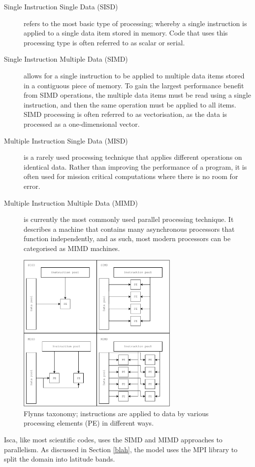 \documentclass[a4paper,11pt]{report}
\begin{document}
\begin{description}
	\item[Single Instruction Single Data (SISD)] refers to the most basic type of processing; whereby a single instruction is applied to a single data item stored in memory. Code that uses this processing type is often referred to as scalar or serial. 
	
	\item[Single Instruction Multiple Data (SIMD)] allows for a single instruction to be applied to multiple data items stored in a contiguous piece of memory. To gain the largest performance benefit from SIMD operations, the multiple data items must be read using a single instruction, and then the same operation must be applied to all items. SIMD processing is often referred to as vectorisation, as the data is processed as a one-dimensional vector. 
	
	\item[Multiple Instruction Single Data (MISD)] is a rarely used processing technique that applies different operations on identical data. Rather than improving the performance of a program, it is often used for mission critical computations where there is no room for error. 
	
	\item[Multiple Instruction Multiple Data (MIMD)] is currently the most commonly used parallel processing technique. It describes a machine that contains many asynchronous processors that function independently, and as such, most modern processors can be categorised as MIMD machines.
\end{description}
\par
\begin{figure}[htbp]
\begin{center}
\includegraphics[width=0.7\textwidth]{img/flynns.pdf}
\caption[Flynns taxonomy]{Flynns taxonomy; instructions are applied to data by various processing elements (PE) in different ways. }
\label{fig:flynns}
\end{center}
\end{figure}
\par
Isca, like most scientific codes, uses the SIMD and MIMD approaches to parallelism. As discussed in Section \ref{blah}, the model uses the MPI library to split the domain into latitude bands.
\end{document}
